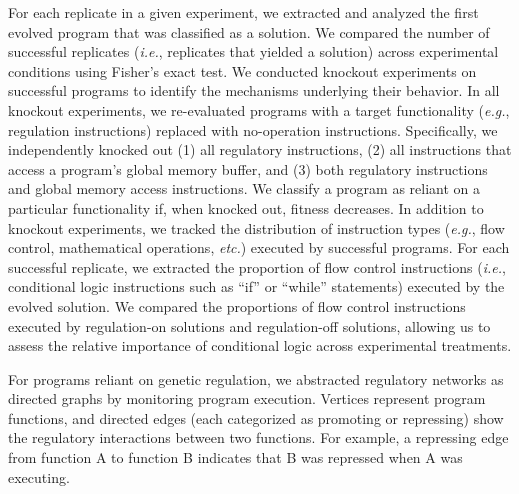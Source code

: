 For each replicate in a given experiment, we extracted and analyzed the first evolved program that was classified as a solution. 
We compared the number of successful replicates (\textit{i.e.}, replicates that yielded a solution) across experimental conditions using Fisher's exact test.
We conducted knockout experiments on successful programs to identify the mechanisms underlying their behavior.
In all knockout experiments, we re-evaluated programs with a target functionality (\textit{e.g.}, regulation instructions) replaced with no-operation instructions.
Specifically, we independently knocked out (1) all regulatory instructions, (2) all instructions that access a program's global memory buffer, and (3) both regulatory instructions and global memory access instructions. 
We classify a program as reliant on a particular functionality if, when knocked out, fitness decreases. 
In addition to knockout experiments, we tracked the distribution of instruction types (\textit{e.g.}, flow control, mathematical operations, \textit{etc.}) executed by successful programs. 
For each successful replicate, we extracted the proportion of flow control instructions (\textit{i.e.}, conditional logic instructions such as ``if'' or ``while'' statements) executed by the evolved solution. 
We compared the proportions of flow control instructions executed by regulation-on solutions and regulation-off solutions, allowing us to assess the relative importance of conditional logic across experimental treatments.

For programs reliant on genetic regulation, we abstracted regulatory networks as directed graphs by monitoring program execution.
Vertices represent program functions, and directed edges (each categorized as promoting or repressing) show the regulatory interactions between two functions.
For example, a repressing edge from function A to function B indicates that B was repressed when A was executing.

